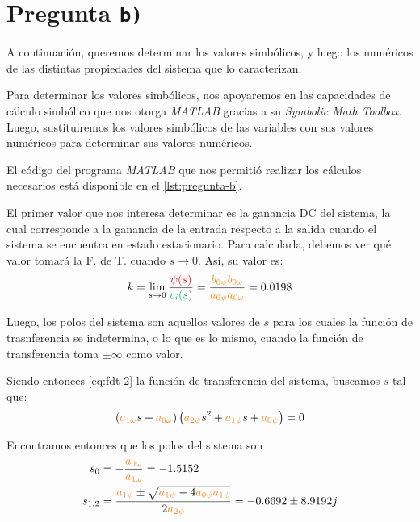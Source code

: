 \section{Pregunta \texttt{b)}}\label{pregunta-b}

A continuación, queremos determinar los valores simbólicos, y luego los
numéricos de las distintas propiedades del sistema que lo caracterizan.

Para determinar los valores simbólicos, nos apoyaremos en las capacidades
de cálculo simbólico que nos otorga \textit{MATLAB} gracias a su
\textit{Symbolic Math Toolbox}. Luego, sustituiremos los valores simbólicos de
las variables con sus valores numéricos para determinar sus valores numéricos.

El código del programa \textit{MATLAB} que nos permitió realizar los cálculos
necesarios está disponible en el \autoref{lst:pregunta-b}.

El primer valor que nos interesa determinar es la ganancia DC del sistema, la
cual corresponde a la ganancia de la entrada respecto a la salida cuando el
sistema se encuentra en estado estacionario. Para calcularla, debemos ver qué
valor tomará la F. de T. cuando $s \to 0$. Así, su valor es:
\begin{equation}\label{eq:gdc}
  k = \lim_{s \to 0} \frac{\rojo{\psi(s)}}{\verd{v_{i} (s)}} =
    \frac{\nara{b_{0\psi}b_{0\omega}}}{\nara{a_{0\psi}a_{0\omega}}} = 0.0198
\end{equation}

Luego, los polos del sistema son aquellos valores de $s$ para los cuales la
función de trasnferencia se indetermina, o lo que es lo mismo, cuando la
función de transferencia toma $\pm\infty$ como valor.

Siendo entonces \eqref{eq:fdt-2} la función de transferencia del sistema,
buscamos $s$ tal que:
\begin{equation}
  \left(\nara{a_{1\omega}}s + \nara{a_{0\omega}}\right)\left(\nara{a_{2\psi}}s^{2} + \nara{a_{1\psi}}s + \nara{a_{0\psi}}\right) = 0
\end{equation}

Encontramos entonces que los polos del sistema son
\begin{align}
  s_{0} &= -\frac{\nara{a_{0\omega}}}{\nara{a_{1\omega}}} = -1.5152 \\
  s_{1,2} &= \frac{\nara{a_{1\psi}} \pm \sqrt{\nara{a_{1\psi}} - 4 \nara{a_{0\psi}a_{1\psi}}}}{2\nara{a_{2\psi}}} = -0.6692 \pm 8.9192j
\end{align}

